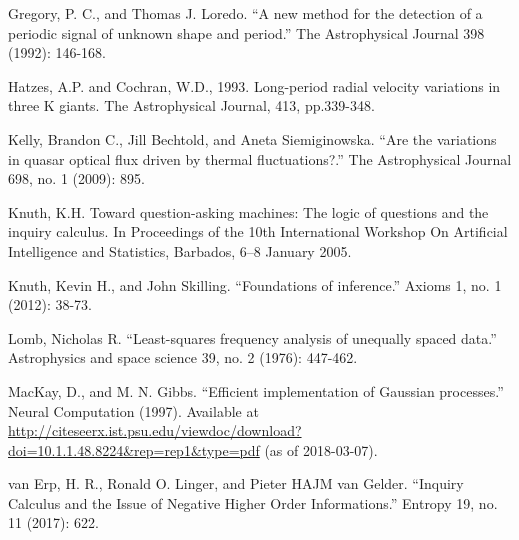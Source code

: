 \documentclass[a4paper, 12pt]{article}
\begin{document}
\begin{thebibliography}{999}
Gregory, P. C., and Thomas J. Loredo. ``A new method for the detection of a periodic signal of unknown shape and period.'' The Astrophysical Journal 398 (1992): 146-168.

Hatzes, A.P. and Cochran, W.D., 1993. Long-period radial velocity variations in three K giants. The Astrophysical Journal, 413, pp.339-348.

Kelly, Brandon C., Jill Bechtold, and Aneta Siemiginowska. ``Are the variations in quasar optical flux driven by thermal fluctuations?.'' The Astrophysical Journal 698, no. 1 (2009): 895.

Knuth, K.H. Toward question-asking machines: The logic of questions and the inquiry calculus. In
Proceedings of the 10th International Workshop On Artificial Intelligence and Statistics, Barbados, 6–8
January 2005.

Knuth, Kevin H., and John Skilling. ``Foundations of inference.''
Axioms 1, no. 1 (2012): 38-73.

Lomb, Nicholas R. ``Least-squares frequency analysis of unequally spaced data.'' Astrophysics and space science 39, no. 2 (1976): 447-462.

MacKay, D., and M. N. Gibbs. ``Efficient implementation of Gaussian processes.'' Neural Computation (1997).
Available at \url{http://citeseerx.ist.psu.edu/viewdoc/download?doi=10.1.1.48.8224&rep=rep1&type=pdf}
(as of 2018-03-07).

van Erp, H. R., Ronald O. Linger, and Pieter HAJM van Gelder. ``Inquiry Calculus and the Issue of Negative Higher Order Informations.'' Entropy 19, no. 11 (2017): 622.

\end{thebibliography}
\end{document}
